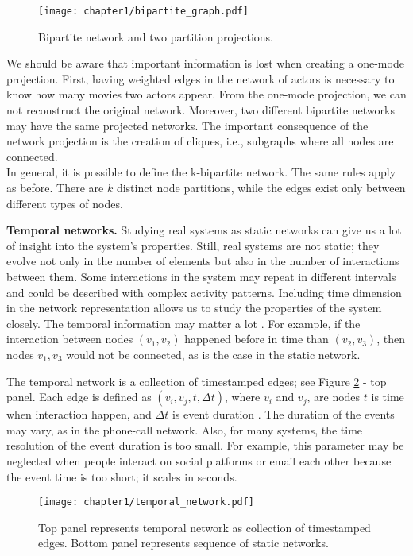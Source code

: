 \begin{figure}[h]
	\centering
	\texttt{[image: chapter1/bipartite\_graph.pdf]} 
	\caption[Bipartite network.]{Bipartite network and two partition projections.}
	\label{fig:bipartite}
\end{figure}

We should be aware that important information is lost when creating a one-mode projection. First, having weighted edges in the network of actors is necessary to know how many movies two actors appear. From the one-mode projection, we can not reconstruct the original network. Moreover, two different bipartite networks may have the same projected networks. The important consequence of the network projection is the creation of cliques, i.e., subgraphs where all nodes are connected. \\
In general, it is possible to define the k-bipartite network. The same rules apply as before. There are $k$ distinct node partitions, while the edges exist only between different types of nodes.

\textbf{Temporal networks.}
Studying real systems as static networks can give us a lot of insight into the system's properties. Still, real systems are not static; they evolve not only in the number of elements but also in the number of interactions between them. Some interactions in the system may repeat in different intervals and could be described with complex activity patterns. Including time dimension in the network representation allows us to study the properties of the system closely. The temporal information may matter a lot \cite{holme2012}. For example, if the interaction between nodes $(v_1, v_2)$ happened before in time than  $(v_2, v_3)$, then nodes $v_1, v_3$ would not be connected, as is the case in the static network. 

The temporal network is a collection of timestamped edges; see Figure \ref{fig:temporal} - top panel. Each edge is defined as $(v_i, v_j, t, \Delta t)$, where $v_i$ and $v_j$, are nodes $t$ is time when interaction happen, and $\Delta t$ is event duration \cite{guide_temporal}. The duration of the events may vary, as in the phone-call network. Also, for many systems, the time resolution of the event duration is too small. For example, this parameter may be neglected when people interact on social platforms or email each other because the event time is too short; it scales in seconds.

\begin{figure}[h]
	\centering
	\texttt{[image: chapter1/temporal\_network.pdf]} 
	\caption[Temporal network.]{Top panel represents temporal network as collection of timestamped edges. Bottom panel represents sequence of static networks.}
	\label{fig:temporal}
\end{figure}

